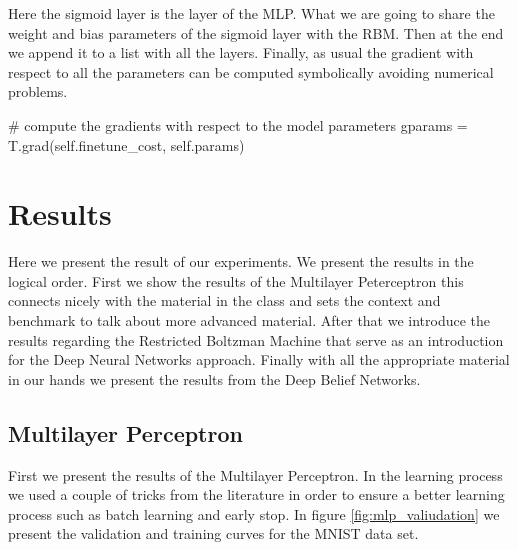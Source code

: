 \documentclass[11pt,a4paper]{article}
\begin{document}
Here the sigmoid layer is the layer of the MLP. What we are going to share the weight and bias parameters of the sigmoid layer with the RBM. Then at the end we append it to a list with all the layers. Finally, as usual the gradient with respect to all the parameters can be computed symbolically avoiding numerical problems.

\begin{python}
# compute the gradients with respect to the model parameters
        gparams = T.grad(self.finetune_cost, self.params)

\end{python}


\section{Results}

Here we present the result of our experiments. We present the results in the logical order. First we show the results of the Multilayer Peterceptron this connects nicely with the material in the class and sets the context and benchmark to talk about more advanced material. After that we introduce the results regarding the Restricted Boltzman Machine that serve as an introduction for the Deep Neural Networks approach. Finally with all the appropriate material in our hands we present the results from the Deep Belief Networks. 

\subsection{Multilayer Perceptron}

First we present the results of the Multilayer Perceptron. In the learning process we used a couple of tricks from the literature in order to ensure a better learning  process \citep{lecun2012efficient} such as batch learning and early stop. In figure \ref{fig:mlp_valiudation} we present the validation and training curves for the MNIST data set. 
\end{document}
